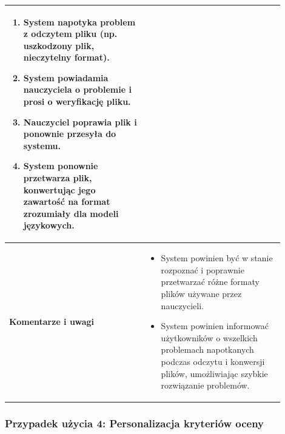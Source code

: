 \documentclass[a4paper, 12pt]{article}
\begin{document}
\begin{table}[H]
\begin{tabular}{|p{0.45\linewidth}|p{0.45\linewidth}|}
\begin{enumerate}
    \item System napotyka problem z odczytem pliku (np. uszkodzony plik, nieczytelny format).
    \item System powiadamia nauczyciela o problemie i prosi o weryfikację pliku.
    \item Nauczyciel poprawia plik i ponownie przesyła do systemu.
    \item System ponownie przetwarza plik, konwertując jego zawartość na format zrozumiały dla modeli językowych.
\end{enumerate} \\
\hline
\textbf{Komentarze i uwagi} &
\begin{itemize}
    \item System powinien być w stanie rozpoznać i poprawnie przetwarzać różne formaty plików używane przez nauczycieli.
    \item System powinien informować użytkowników o wszelkich problemach napotkanych podczas odczytu i konwersji plików, umożliwiając szybkie rozwiązanie problemów.
\end{itemize} \\
\hline
\end{tabular}
\end{table}

\subsubsection{Przypadek użycia 4: Personalizacja kryteriów oceny}
\end{document}
